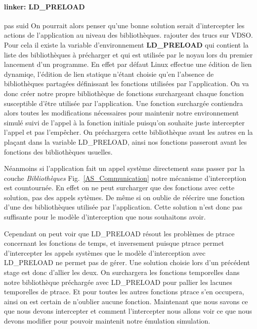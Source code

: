 \paragraph{linker: LD\_PRELOAD}
pas suid
On pourrait alors penser qu'une bonne solution serait d'intercepter les actions
de l'application au niveau des bibliothèques.{\color{red} rajouter des trucs sur
  VDSO}. Pour cela il existe la variable d'environnement \textbf{LD\_PRELOAD}
qui contient la liste des bibliothèques à précharger et qui est utilisée par le
noyau lors du premier lancement d'un programme. En effet par défaut Linux
effectue une édition de lien dynamiqe, l'édition de lien statique n'étant
choisie qu'en l'absence de bibliothèques partagées définissant les fonctions
utilisées par l'application. On va donc créer notre propre bibliothèque de
fonctions surchargeant chaque fonction susceptible d'être utilisée par
l'application. Une fonction surchargée contiendra alors toutes les modifications
nécessaires pour maintenir notre environnement simulé suivi de l'appel à la
fonction initiale puisqu'on souhaite juste intercepter l'appel et pas
l'empêcher. On préchargera cette bibliothèque avant les autres en la plaçant
dans la variable LD\_PRELOAD, ainsi nos fonctions passeront avant les fonctions
des bibliothèques usuelles.

Néanmoins si l'application fait un appel système directement sans passer par la
couche \textit{Bibliothèques} Fig.~\ref{AS_Communication} notre mécanisme
d'interception est countournée. En effet on ne peut surcharger que des fonctions
avec cette solution, pas des appels sytèmes. De même si on oublie de réécrire
une fonction d'une des bibliothèques utilisée par l'application. Cette solution
n'est donc pas suffisante pour le modèle d'interception que nous souhaitons
avoir.

Cependant on peut voir que LD\_PRELOAD résout les problèmes de ptrace concernant
les fonctions de temps, et inversement puisque ptrace permet d'intercepter les
appels systèmes que le modèle d'interception avec LD\_PRELOAD ne permet pas de
gérer. Une solution choisie lors d'un précédent stage est donc d'allier les
deux. On surchargera les fonctions temporelles dans notre bibliothèque
préchargée avec LD\_PRELOAD pour pallier les lacunes temporelles de ptrace. Et
pour toutes les autres fonctions ptrace s'en occupera, ainsi on est certain de
n'oublier aucune fonction. Maintenant que nous savons ce que nous devons
intercepter et comment l'intercepter nous allons voir ce que nous devons
modifier pour pouvoir maintenit notre émulation simulation.


